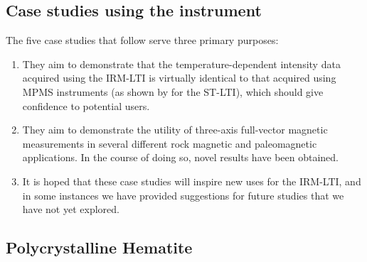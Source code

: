 \documentclass[draft,gc]{AGUTeX}
\begin{document}
\begin{article}
\section{Case studies using the instrument}
The five case studies that follow serve three primary purposes:
\begin{enumerate}
\item They aim to demonstrate that the temperature-dependent intensity data acquired using the IRM-LTI is virtually identical to that acquired using MPMS instruments (as shown by \cite{Smirnov2011a} for the ST-LTI), which should give confidence to potential users. 
\item They aim to demonstrate the utility of three-axis full-vector magnetic measurements in several different rock magnetic and paleomagnetic applications. In the course of doing so, novel results have been obtained.
\item It is hoped that these case studies will inspire new uses for the IRM-LTI, and in some instances we have provided suggestions for future studies that we have not yet explored. 
\end{enumerate}

\subsection{Polycrystalline Hematite}


\end{article}
\end{document}
